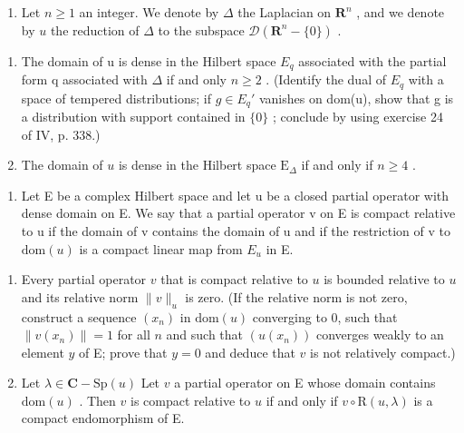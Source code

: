 \begin{enumerate}
\def\labelenumi{\arabic{enumi})}
\setcounter{enumi}{40}
\tightlist
\item
  Let \(n \geqslant 1\) an integer. We denote by \(\Delta\) the Laplacian on \(\mathbf{R}^n\) , and we denote by \(u\) the reduction of \(\Delta\) to the subspace \(\mathcal{D}(\mathbf{R}^n - \{0\})\) .
\end{enumerate}

\begin{enumerate}
\def\labelenumi{\alph{enumi})}
\item
  The domain of u is dense in the Hilbert space \(E_{q}\) associated with the partial form q associated with \(\Delta\) if and only \(n \geqslant 2\) . (Identify the dual of \(E_{q}\) with a space of tempered distributions; if \(g \in E_{q}'\) vanishes on dom(u), show that g is a distribution with support contained in \(\{0\}\) ; conclude by using exercise 24 of IV, p. 338.)
\item
  The domain of \(u\) is dense in the Hilbert space \(\mathrm{E}_{\Delta}\) if and only if \(n \geqslant 4\) .
\end{enumerate}

\begin{enumerate}
\def\labelenumi{\arabic{enumi})}
\setcounter{enumi}{41}
\tightlist
\item
  Let E be a complex Hilbert space and let u be a closed partial operator with dense domain on E. We say that a partial operator v on E is compact relative to u if the domain of v contains the domain of u and if the restriction of v to \(\text{dom}(u)\) is a compact linear map from \(E_{u}\) in E.
\end{enumerate}

\begin{enumerate}
\def\labelenumi{\alph{enumi})}
\item
  Every partial operator \(v\) that is compact relative to \(u\) is bounded relative to \(u\) and its relative norm \(\| v \|_u\) is zero. (If the relative norm is not zero, construct a sequence \((x_n)\) in \(\text{dom}(u)\) converging to 0, such that \(\| v(x_n) \| = 1\) for all \(n\) and such that \((u(x_n))\) converges weakly to an element \(y\) of E; prove that \(y = 0\) and deduce that \(v\) is not relatively compact.)
\item
  Let \(\lambda \in \mathbf{C} - \mathrm{Sp}(u)\) Let \(v\) a partial operator on E whose domain contains \(\mathrm{dom}(u)\) . Then \(v\) is compact relative to \(u\) if and only if \(v \circ \mathrm{R}(u, \lambda)\) is a compact endomorphism of E.
\end{enumerate}

